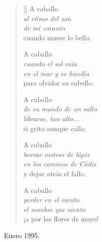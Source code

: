 \documentclass[a4paper,11pt]{article}
\begin{document}

\settowidth{\versewidth}{borrar rostros de lápiz}

\bigskip

\begin{verse}[\versewidth]
  A caballo \\
  \qquad \emph{al ritmo del son} \\
  \qquad \emph{de mi corazón} \\
  cuando muere lo bello.

  A caballo \\
  \qquad \emph{cuando el sol caía} \\
  \qquad \emph{en el mar y se hundía} \\
  para olvidar su cabello.

  A caballo \\
  \qquad \emph{de su mundo de un salto} \\
  \qquad \emph{librarse, tan alto...} \\
  si grito aunque callo.

  A caballo \\
  \qquad \emph{borrar rostros de lápiz} \\
  \qquad \emph{en los caminos de Cádiz} \\
  y dejar atrás el fallo.

  A caballo \\
  \qquad \emph{perder en el viento} \\
  \qquad \emph{el nombre que siento} \\
  ¡a por las flores de mayo!
\end{verse}

\bigskip
\bigskip

\hfill Enero 1995.
\end{document}

